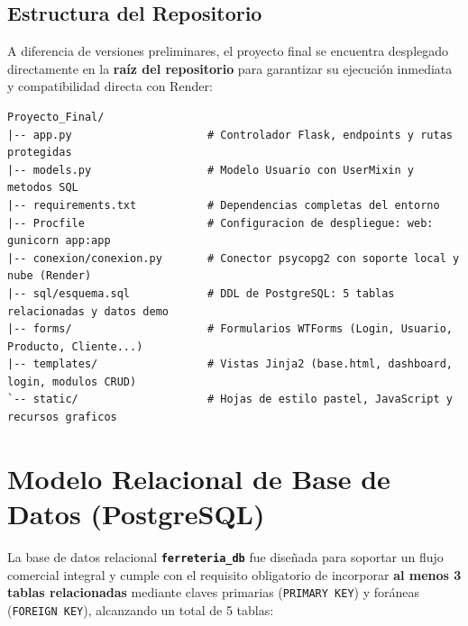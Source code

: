 \documentclass[11pt,a4paper]{article}
\begin{document}
\subsection{Estructura del Repositorio}
A diferencia de versiones preliminares, el proyecto final se encuentra desplegado directamente en la \textbf{raíz del repositorio} para garantizar su ejecución inmediata y compatibilidad directa con Render:
\begin{lstlisting}
Proyecto_Final/
|-- app.py                     # Controlador Flask, endpoints y rutas protegidas
|-- models.py                  # Modelo Usuario con UserMixin y metodos SQL
|-- requirements.txt           # Dependencias completas del entorno
|-- Procfile                   # Configuracion de despliegue: web: gunicorn app:app
|-- conexion/conexion.py       # Conector psycopg2 con soporte local y nube (Render)
|-- sql/esquema.sql            # DDL de PostgreSQL: 5 tablas relacionadas y datos demo
|-- forms/                     # Formularios WTForms (Login, Usuario, Producto, Cliente...)
|-- templates/                 # Vistas Jinja2 (base.html, dashboard, login, modulos CRUD)
`-- static/                    # Hojas de estilo pastel, JavaScript y recursos graficos
\end{lstlisting}

\section{Modelo Relacional de Base de Datos (PostgreSQL)}

La base de datos relacional \textbf{\texttt{ferreteria\_db}} fue diseñada para soportar un flujo comercial integral y cumple con el requisito obligatorio de incorporar \textbf{al menos 3 tablas relacionadas} mediante claves primarias (\texttt{PRIMARY KEY}) y foráneas (\texttt{FOREIGN KEY}), alcanzando un total de 5 tablas:
\end{document}
